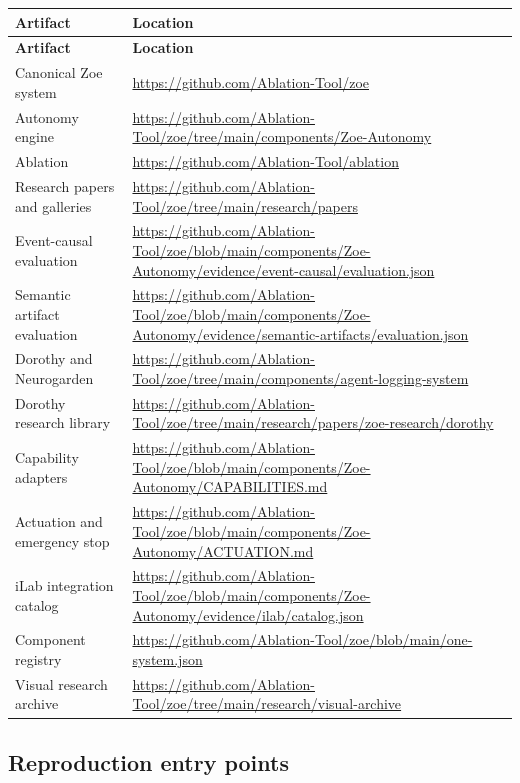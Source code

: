 \documentclass[11pt]{article}
\begin{document}
\begin{longtable}{p{}p{}}
\toprule
\textbf{Artifact} & \textbf{Location}\\
\midrule
\endfirsthead
\toprule
\textbf{Artifact} & \textbf{Location}\\
\midrule
\endhead
Canonical Zoe system & \url{https://github.com/Ablation-Tool/zoe}\\
Autonomy engine & \url{https://github.com/Ablation-Tool/zoe/tree/main/components/Zoe-Autonomy}\\
Ablation & \url{https://github.com/Ablation-Tool/ablation}\\
Research papers and galleries & \url{https://github.com/Ablation-Tool/zoe/tree/main/research/papers}\\
Event-causal evaluation & \url{https://github.com/Ablation-Tool/zoe/blob/main/components/Zoe-Autonomy/evidence/event-causal/evaluation.json}\\
Semantic artifact evaluation & \url{https://github.com/Ablation-Tool/zoe/blob/main/components/Zoe-Autonomy/evidence/semantic-artifacts/evaluation.json}\\
Dorothy and Neurogarden & \url{https://github.com/Ablation-Tool/zoe/tree/main/components/agent-logging-system}\\
Dorothy research library & \url{https://github.com/Ablation-Tool/zoe/tree/main/research/papers/zoe-research/dorothy}\\
Capability adapters & \url{https://github.com/Ablation-Tool/zoe/blob/main/components/Zoe-Autonomy/CAPABILITIES.md}\\
Actuation and emergency stop & \url{https://github.com/Ablation-Tool/zoe/blob/main/components/Zoe-Autonomy/ACTUATION.md}\\
iLab integration catalog & \url{https://github.com/Ablation-Tool/zoe/blob/main/components/Zoe-Autonomy/evidence/ilab/catalog.json}\\
Component registry & \url{https://github.com/Ablation-Tool/zoe/blob/main/one-system.json}\\
Visual research archive & \url{https://github.com/Ablation-Tool/zoe/tree/main/research/visual-archive}\\
\bottomrule
\end{longtable}

\subsection{Reproduction entry points}
\end{document}
